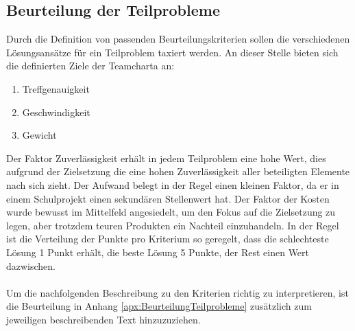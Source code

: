 	\subsection{Beurteilung der Teilprobleme}
		Durch die Definition von passenden Beurteilungskriterien sollen die verschiedenen Lösungsansätze für ein Teilproblem taxiert werden. An dieser Stelle bieten sich die definierten Ziele der Teamcharta an:
		
		\begin{enumerate}
			\item Treffgenauigkeit
			\item Geschwindigkeit
			\item Gewicht
		\end{enumerate}
		Der Faktor Zuverlässigkeit erhält in jedem Teilproblem eine hohe Wert, dies aufgrund der Zielsetzung die eine hohen Zuverlässigkeit aller beteiligten Elemente nach sich zieht. Der Aufwand belegt in der Regel einen kleinen Faktor, da er in einem Schulprojekt einen sekundären Stellenwert hat. Der Faktor der Kosten wurde bewusst im Mittelfeld angesiedelt, um den Fokus auf die Zielsetzung zu legen, aber trotzdem teuren Produkten ein Nachteil einzuhandeln.
		In der Regel ist die Verteilung der Punkte pro Kriterium so geregelt, dass die schlechteste Lösung 1 Punkt erhält, die beste Lösung 5 Punkte, der Rest einen Wert dazwischen.\\
		\\
		Um die nachfolgenden Beschreibung zu den Kriterien richtig zu interpretieren, ist die Beurteilung in Anhang \ref{apx:BeurteilungTeilprobleme} zusätzlich zum jeweiligen beschreibenden Text hinzuzuziehen. 
